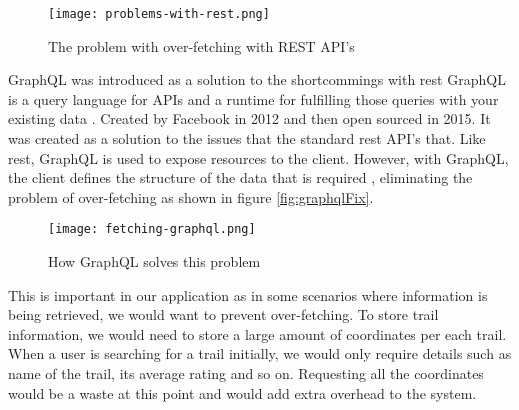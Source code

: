 \begin{figure}[ht]
    \centering
    \texttt{[image: problems-with-rest.png]}
    \caption{The problem with over-fetching with REST API's}
    \label{fig:restProblem}
\end{figure}

GraphQL was introduced as a solution to the shortcommings with \acrshort{rest} GraphQL is a query language for APIs and a runtime for fulfilling those queries with your existing data \cite{graphQl}. Created by Facebook in 2012 and then open sourced in 2015. It was created as a solution to the issues that the standard \acrshort{rest} API's that. Like \acrshort{rest}, GraphQL is used to expose resources to the client. However, with GraphQL, the client defines the structure of the data that is required \cite{howToGraphQl}, eliminating the problem of over-fetching as shown in figure \autoref{fig:graphqlFix}.

\begin{figure}[ht]
    \centering
    \texttt{[image: fetching-graphql.png]}
    \caption{How GraphQL solves this problem}
    \label{fig:graphqlFix}
\end{figure}

This is important in our application as in some scenarios where information is being retrieved, we would want to prevent over-fetching. To store trail information, we would need to store a large amount of coordinates per each trail. When a user is searching for a trail initially, we would only require details such as name of the trail, its average rating and so on. Requesting all the coordinates would be a waste at this point and would add extra overhead to the system. 